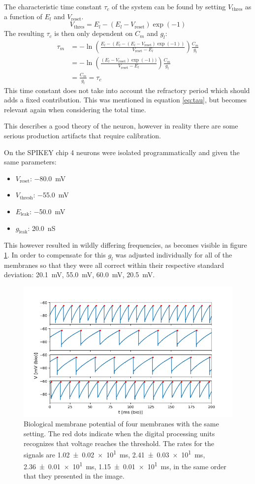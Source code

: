 \documentclass[a4paper,twocolumn]{article}
\begin{document}
The characteristic time constant $\tau_c$ of the system can be found by setting
$V_\text{thres}$ as a function of $E_l$ and $V_\text{reset}$.
\[
    V_\text{thres} = E_l - (E_l - V_\text{reset})\exp(-1)
\]
The resulting $\tau_c$ is then only dependent on $C_m$ and $g_l$:
\begin{align*}
    \tau_m &= -\ln(\frac{E_l - (E_l - (E_l - V_\text{reset})\exp(-1))}{V_\text{reset} - E_l}) \frac{C_m}{g_l}\\
           &= -\ln(\frac{(E_l - V_\text{reset})\exp(-1))}{V_\text{reset} - E_l})\frac{C_m}{g_l} \\
           &= \frac{C_m}{g_l} = \tau_c
\end{align*}
This time constant does not take into account the refractory period which should
adds a fixed contribution. This was mentioned in equation \eqref{eq:tau}, but
becomes relevant again when considering the total time.

This describes a good theory of the neuron, however in reality there are some
serious production artifacts that require calibration.

On the SPIKEY chip 4 neurons were isolated programmatically and given the same
parameters:
\begin{itemize}
    \item $V_\text{reset}$: \SI{-80.0}{\milli\volt}
    \item $V_\text{thresh}$: \SI{-55.0}{\milli\volt}
    \item $E_\text{leak}$: \SI{-50.0}{\milli\volt}
    \item $g_\text{leak}$:  \SI{20.0}{\nano\siemens}
\end{itemize}

This however resulted in wildly differing frequencies, as becomes visible in
figure \ref{fig:4membranes}. In order to compensate for this $g_l$ was adjusted
individually for all of the membranes so that they were all correct within their
respective standard deviation: \SI{20.1}{\milli\volt}, \SI{55.0}{\milli\volt},
\SI{60.0}{\milli\volt}, \SI{20.5}{\milli\volt}.

\begin{figure}[ht]
    \centering
    \includegraphics[width=.5\textwidth]{figures/4membranes.png}
    \caption{Biological membrane potential of four membranes with the same
    setting. The red dots indicate when the digital processing units recognizes
    that voltage reaches the threshold. The rates for the signals are
    \SI{1.02(2)e1}{\milli\second}, \SI{2.41(3)e1}{\milli\second},
    \SI{2.36(1)e1}{\milli\second}, \SI{1.15(1)e1}{\milli\second}, in the same
    order that they presented in the image. }
    \label{fig:4membranes}
\end{figure}
\end{document}
